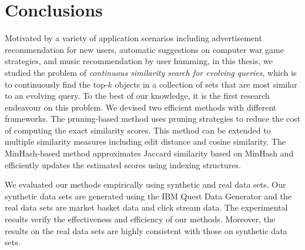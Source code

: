
%
%

\chapter{Conclusions}
\label{ch:con}
Motivated by a variety of application scenarios including advertisement recommendation for new users, automatic suggestions on computer war game strategies, and music recommendation by user humming, in this thesis, we studied the problem of \emph{continuous similarity search for evolving queries}, which is to continuously find the top-$k$ objects in a collection of sets that are most similar to an evolving query. To the best of our knowledge, it is the first research endeavour on this problem. We devised two efficient methods with different frameworks. The pruning-based method uses pruning strategies to reduce the cost of computing the exact similarity scores. This method can be extended to multiple similarity measures including edit distance and cosine similarity. The MinHash-based method approximates Jaccard similarity based on MinHash and efficiently updates the estimated scores using indexing structures. 

We evaluated our methods empirically using synthetic and real data sets. Our synthetic data sets are generated using the IBM Quest Data Generator and the real data sets are market basket data and click stream data. The experimental results verify the effectiveness and efficiency of our methods. Moreover, the results on the real data sets are highly consistent with those on synthetic data sets. 


